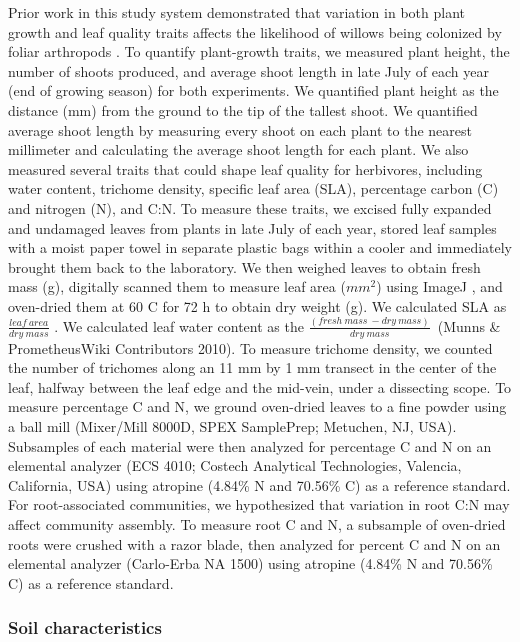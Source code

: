 \documentclass[11pt]{article}
\begin{document}
Prior work in this study system demonstrated that variation in both
plant growth and leaf quality traits affects the likelihood of willows
being colonized by foliar arthropods \cite{Barbour_2015}. To quantify
plant-growth traits, we measured plant height, the number of shoots
produced, and average shoot length in late July of each year (end of
growing season) for both experiments. We quantified plant height as the
distance (mm) from the ground to the tip of the tallest shoot. We
quantified average shoot length by measuring every shoot on each plant
to the nearest millimeter and calculating the average shoot length for
each plant. We also measured several traits that could shape leaf
quality for herbivores, including water content, trichome density,
specific leaf area (SLA), percentage carbon (C) and nitrogen (N), and
C:N. To measure these traits, we excised fully expanded and undamaged
leaves from plants in late July of each year, stored leaf samples with a
moist paper towel in separate plastic bags within a cooler and
immediately brought them back to the laboratory. We then weighed leaves
to obtain fresh mass (g), digitally scanned them to measure leaf area
(\(mm^2\)) using ImageJ \cite{abramoff2004image}, and oven-dried them at
60 \degree C for 72 h to obtain dry weight (g)\cite{cornelissen2003handbook}. We calculated
SLA as \(\frac{leaf\ area}{dry\ mass}\) \cite{cornelissen2003handbook}. We calculated leaf water content as
the \(\frac{\left(fresh\ mass\ -dry\ mass\right)}{dry\ mass}\)~(Munns \& PrometheusWiki Contributors 2010). To
measure trichome density, we counted the number of trichomes along an 11
mm by 1 mm transect in the center of the leaf, halfway between the leaf
edge and the mid-vein, under a dissecting scope. To measure percentage C
and N, we ground oven-dried leaves to a fine powder using a ball mill
(Mixer/Mill 8000D, SPEX SamplePrep; Metuchen, NJ, USA). Subsamples of
each material were then analyzed for percentage C and N on an elemental
analyzer (ECS 4010; Costech Analytical Technologies, Valencia,
California, USA) using atropine (4.84\% N and 70.56\% C) as a reference
standard. For root-associated communities, we hypothesized that
variation in root C:N may affect community assembly. To measure root C
and N, a subsample of oven-dried roots were crushed with a razor blade,
then analyzed for percent C and N on an elemental analyzer (Carlo-Erba
NA 1500) using atropine (4.84\% N and 70.56\% C) as a reference
standard.

\subsubsection*{Soil characteristics}
\end{document}
